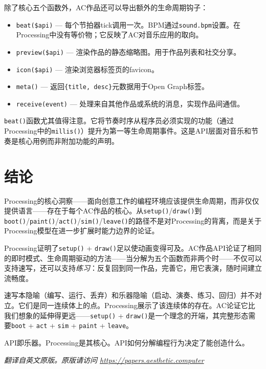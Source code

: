 \documentclass[10pt,letterpaper,twocolumn]{article}
\begin{document}
除了核心五个函数外，AC作品还可以导出额外的生命周期钩子：

\begin{itemize}
  \item \texttt{beat(\$api)} --- 每个节拍器tick调用一次。BPM通过\texttt{sound.bpm}设置。在Processing中没有等价物；它反映了AC对音乐应用的取向。
  \item \texttt{preview(\$api)} --- 渲染作品的静态缩略图。用于作品列表和社交分享。
  \item \texttt{icon(\$api)} --- 渲染浏览器标签页的favicon。
  \item \texttt{meta()} --- 返回\texttt{\{title, desc\}}元数据用于Open Graph标签。
  \item \texttt{receive(event)} --- 处理来自其他作品或系统的消息，实现作品间通信。
\end{itemize}

\texttt{beat()}函数尤其值得注意。它将节奏时序从程序员必须实现的功能（通过Processing中的\texttt{millis()}）提升为第一等生命周期事件。这是API层面对音乐和节奏是核心用例而非附加功能的声明。


\section{结论}
\label{sec:conclusion}

Processing的核心洞察——面向创意工作的编程环境应该提供生命周期，而非仅仅提供语言——存在于每个AC作品的核心。从\texttt{setup()}/\texttt{draw()}到\texttt{boot()}/\texttt{paint()}/\texttt{act()}/\texttt{sim()}/\texttt{leave()}的路径不是对Processing的背离，而是关于Processing模型在进一步扩展时能力边界的论证。

Processing证明了\texttt{setup()} + \texttt{draw()}足以使动画变得可及。AC作品API论证了相同的即时模式、生命周期驱动的方法——当分解为五个函数而非两个时——不仅可以支持速写，还可以支持\emph{练习}：反复回到同一作品，完善它，用它表演，随时间建立流畅度。

速写本隐喻（编写、运行、丢弃）和乐器隐喻（启动、演奏、练习、回归）并不对立。它们是同一连续体上的点。Processing展示了该连续体的存在。AC论证它比我们想象的延伸得更远——\texttt{setup()} + \texttt{draw()}是一个理念的开端，其完整形态需要\texttt{boot} + \texttt{act} + \texttt{sim} + \texttt{paint} + \texttt{leave}。

API即乐器。Processing是其核心。API如何分解编程行为决定了能创造什么。

\vspace{0.5em}
\noindent\textit{翻译自英文原版。原版请访问 \url{https://papers.aesthetic.computer}}



\end{document}
